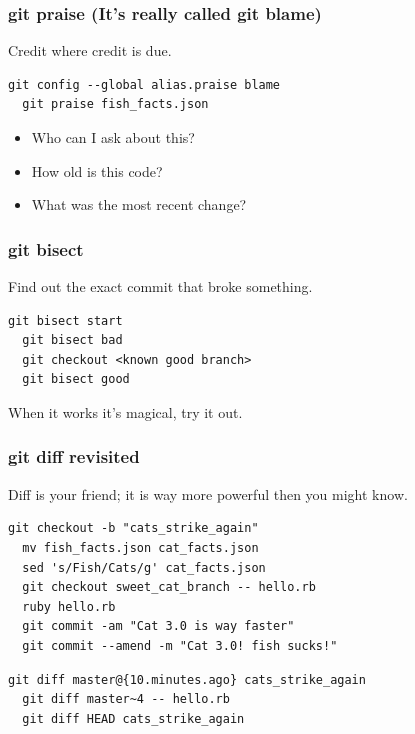 \documentclass{beamer}
\begin{document}
\begin{frame}[fragile]

\frametitle{git praise (It's really called git blame)}

Credit where credit is due.

\vspace{1em}

\begin{lstlisting}[frame=single]
  git config --global alias.praise blame
  git praise fish_facts.json
\end{lstlisting}

\vspace{1em}

\begin{itemize}
  \item{Who can I ask about this?}
  \item{How old is this code?}
  \item{What was the most recent change?}
\end{itemize}

\end{frame}

\begin{frame}[fragile]

\frametitle{git bisect}

Find out the exact commit that broke something.

\vspace{1em}

\begin{lstlisting}[frame=single]
  git bisect start
  git bisect bad
  git checkout <known good branch>
  git bisect good
\end{lstlisting}

When it works it's magical, try it out.

\end{frame}

\begin{frame}[fragile]

\frametitle{git diff revisited}

Diff is your friend; it is way more powerful then you might know.

\vspace{1em}

\begin{lstlisting}[frame=single]
  git checkout -b "cats_strike_again"
  mv fish_facts.json cat_facts.json
  sed 's/Fish/Cats/g' cat_facts.json
  git checkout sweet_cat_branch -- hello.rb
  ruby hello.rb
  git commit -am "Cat 3.0 is way faster"
  git commit --amend -m "Cat 3.0! fish sucks!"
\end{lstlisting}

\vspace{1em}

\begin{lstlisting}[frame=single]
  git diff master@{10.minutes.ago} cats_strike_again
  git diff master~4 -- hello.rb
  git diff HEAD cats_strike_again
\end{lstlisting}

\end{frame}
\end{document}

